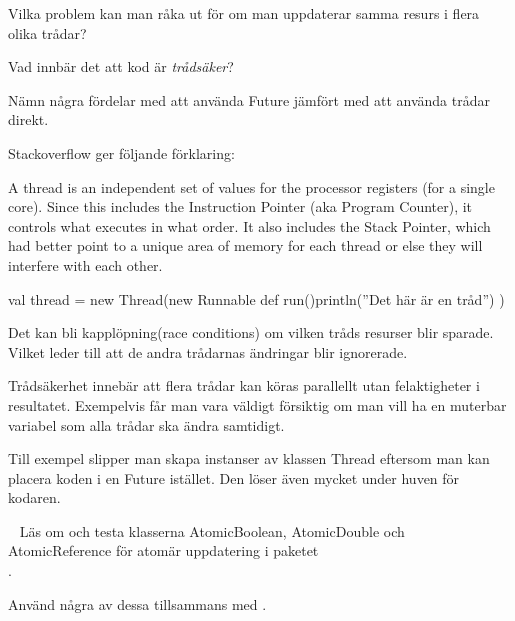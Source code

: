 \Subtask Vilka problem kan man råka ut för om man uppdaterar samma resurs i flera olika trådar?

\Subtask Vad innbär det att kod är \emph{trådsäker}?

\Subtask Nämn några fördelar med att använda Future jämfört med att använda trådar direkt.


\SOLUTION


\TaskSolved \what

\SubtaskSolved  Stackoverflow ger följande förklaring:

A thread is an independent set of values for the processor registers (for a single core). Since this includes the Instruction Pointer (aka Program Counter), it controls what executes in what order. It also includes the Stack Pointer, which had better point to a unique area of memory for each thread or else they will interfere with each other.

\SubtaskSolved

\begin{Code}
val thread = new Thread(new Runnable{
	def run(){println(''Det här är en tråd'')}
})
\end{Code}

\SubtaskSolved  {}

\SubtaskSolved  Det kan bli kapplöpning(race conditions) om vilken tråds resurser blir sparade. Vilket leder till att de andra trådarnas ändringar blir ignorerade.

\SubtaskSolved  Trådsäkerhet innebär att flera trådar kan köras parallellt utan felaktigheter i resultatet. Exempelvis får man vara väldigt försiktig om man vill ha en muterbar variabel som alla trådar ska ändra samtidigt.

\SubtaskSolved  Till exempel slipper man skapa instanser av klassen Thread eftersom man kan placera koden i en Future istället. Den löser även mycket under huven för kodaren.


\QUESTEND







\QUESTBEGIN

\Task  \what~ Läs om och testa klasserna AtomicBoolean, AtomicDouble och AtomicReference för atomär uppdatering i paketet \\ .

Använd några av dessa tillsammans med .



